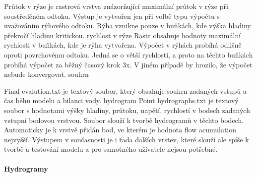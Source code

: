 Průtok v rýze je rastrová vrstva znázorňující maximální průtok v rýze při soustředěném odtoku. Výstup je vytvořen jen při volbě typu výpočtu s uvažováním rýhového odtoku. Rýha vznikne pouze v buňkách, kde výška hladiny překročí hladinu kritickou. 
rychlost v rýze
Rastr obsahuje hodnoty maximální rychlosti v buňkách, kde je rýha vytvořena. Výpočet v rýhách probíhá odlišně oproti povrchovému odtoku. Jedná se o větší rychlosti, a proto na těchto buňkách probíhá výpočet za běžný časový krok 3x. V jiném případě by hrozilo, že výpočet nebude konvergovat.
souhrn

Final evalution.txt je textový soubor, který obsahuje souhrn zadaných vstupů a čas běhu modelu a bilanci vody. 
hydrogram
Point hydrographs.txt je textový soubor s hodnotami výšky hladiny, průtoku, napětí, rychlostí v bodech zadaných vstupní bodovou vrstvou. Soubor slouží k tvorbě hydrogramů v těchto bodech. Automaticky je k vrstvě přidán bod, ve kterém je hodnota flow acumulation nejvyšší.
Výstupem v současnosti je i řada dalších vrstev, které slouží ale spíše k tvorbě a testování modelu a pro samotného uživatele nejsou potřebné.	


\paragraph{Hydrogramy} \label{sec:hydrogramy}



